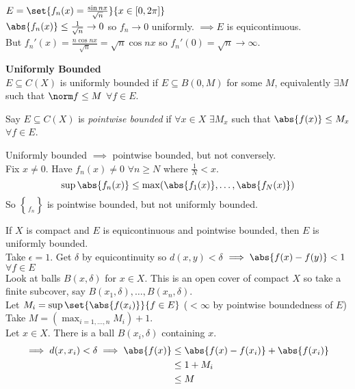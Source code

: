 \ex $E=\set{f_n(x)=\frac{\sin nx}{\sqrt n}}{x\in[0,2\pi]}$ \\
$\abs{f_n(x)}\leq\frac{1}{\sqrt n}\to0$ so $f_n\to0$ uniformly. $\implies E$ is equicontinuous. \\
But $f_n'(x)=\frac{n\cos nx}{\sqrt n}=\sqrt n\cos nx$ so $f_n'(0)=\sqrt n\to\infty$.

\textbf{Uniformly Bounded} \\
$E\subseteq C(X)$ is uniformly bounded if $E\subseteq B(0,M)$ for some $M$, equivalently $\exists M$ such that $\norm f\leq M$ $\forall f\in E$.

 Say $E\subseteq C(X)$ is \emph{pointwise bounded} if $\forall x\in X$ $\exists M_x$ such that $\abs{f(x)}\leq M_x$ $\forall f\in E$.

Uniformly bounded $\implies$ pointwise bounded, but not conversely. \\
Fix $x\neq0$.  Have $f_n(x)\neq0$ $\forall n\geq N$ where $\frac{1}{N}<x$.
\[ \sup\abs{f_n(x)} \leq \max(\abs{f_1(x)},\dotsc,\abs{f_N(x)}) \]
So $\brace{f_n}$ is pointwise bounded, but not uniformly bounded.

\prop If $X$ is compact and $E$ is equicontinuous and pointwise bounded, then $E$ is uniformly bounded. \\
\pf Take $\epsilon=1$.  Get $\delta$ by equicontinuity so $d(x,y)<\delta$ $\implies\abs{f(x)-f(y)}<1$ $\forall f\in E$ \\
Look at balls $B(x,\delta)$ for $x\in X$.  This is an open cover of compact $X$ so take a finite subcover, say $B(x_1,\delta),\dotsc,B(x_n,\delta)$. \\
Let $M_i=\sup\set{\abs{f(x_i)}}{f\in E}$ ($<\infty$ by pointwise boundedness of $E$) \\
Take $M=(\max_{i=1,\dotsc,n}M_i)+1$. \\
Let $x\in X$.  There is a ball $B(x_i,\delta)$ containing $x$.
\begin{align*}
\implies d(x,x_i)<\delta \implies \abs{f(x)} &\leq \abs{f(x)-f(x_i)} + \abs{f(x_i)} \\
&\leq 1 + M_i \\
&\leq M
\end{align*}

